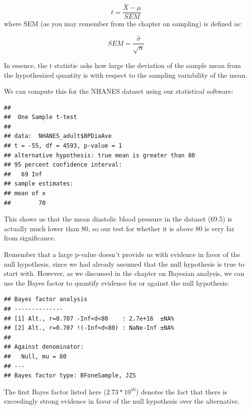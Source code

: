 \documentclass[12pt,]{book}
\newenvironment{Shaded}{\begin{snugshade}}{\end{snugshade}}
\newcommand{\DataTypeTok}[1]{\textcolor[rgb]{0.13,0.29,0.53}{#1}}
\newcommand{\DecValTok}[1]{\textcolor[rgb]{0.00,0.00,0.81}{#1}}
\newcommand{\KeywordTok}[1]{\textcolor[rgb]{0.13,0.29,0.53}{\textbf{#1}}}
\newcommand{\NormalTok}[1]{#1}
\newcommand{\OperatorTok}[1]{\textcolor[rgb]{0.81,0.36,0.00}{\textbf{#1}}}
\newcommand{\OtherTok}[1]{\textcolor[rgb]{0.56,0.35,0.01}{#1}}
\theoremstyle{definition}
\theoremstyle{definition}
\theoremstyle{definition}
\theoremstyle{remark}
\begin{document}
\[
t = \frac{\bar{X} - \mu}{SEM}
\]
where SEM (as you may remember from the chapter on sampling) is defined as:

\[
SEM = \frac{\hat{\sigma}}{\sqrt{n}}
\]

In essence, the t statistic asks how large the deviation of the sample mean from the hypothesized quantity is with respect to the sampling variability of the mean.

We can compute this for the NHANES dataset using our statistical software:

\begin{verbatim}
## 
##  One Sample t-test
## 
## data:  NHANES_adult$BPDiaAve
## t = -55, df = 4593, p-value = 1
## alternative hypothesis: true mean is greater than 80
## 95 percent confidence interval:
##   69 Inf
## sample estimates:
## mean of x 
##        70
\end{verbatim}

This shows us that the mean diastolic blood pressure in the dataset (69.5) is actually much lower than 80, so our test for whether it is above 80 is very far from significance.

Remember that a large p-value doesn't provide us with evidence in favor of the null hypothesis, since we had already assumed that the null hypothesis is true to start with. However, as we discussed in the chapter on Bayesian analysis, we can use the Bayes factor to quantify evidence for or against the null hypothesis:

\begin{Shaded}
\end{Shaded}

\begin{verbatim}
## Bayes factor analysis
## --------------
## [1] Alt., r=0.707 -Inf<d<80    : 2.7e+16  ±NA%
## [2] Alt., r=0.707 !(-Inf<d<80) : NaNe-Inf ±NA%
## 
## Against denominator:
##   Null, mu = 80 
## ---
## Bayes factor type: BFoneSample, JZS
\end{verbatim}

The first Bayes factor listed here (\(2.73 * 10^{16}\)) denotes the fact that there is exceedingly strong evidence in favor of the null hypothesis over the alternative.
\end{document}
